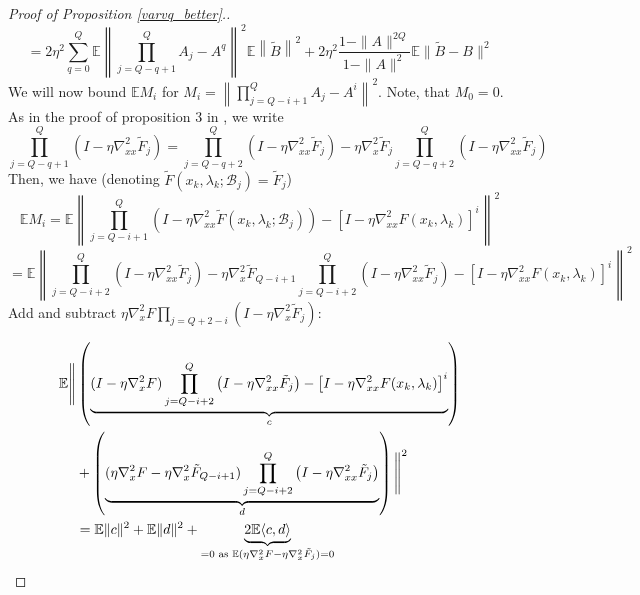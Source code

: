 \documentclass[11pt, twoside]{report}
\begin{document}
\begin{proof}[Proof of Proposition \ref{varvq_better}.]
\[= 2 \eta^2 \sum_{q=0}^{Q} \mathbb{E} \left\| \prod_{j = Q-q+1}^Q A_j - A^{q} \right \|^2 \mathbb{E} \left\| \tilde{B} \right\|^2 + 2\eta^2 \frac{1-\|A\|^{2Q}}{1-\|A\|^2} \mathbb{E} \|\tilde{B} - B\|^2\]
We will now bound $\mathbb{E}M_i$ for $M_i = \left\| \prod_{j = Q-i+1}^Q A_j - A^{i} \right \|^2$. Note, that $M_0 = 0.$ As in the proof of proposition 3 in \cite{stocBio}, we write
    \[\prod_{j=Q-q + 1}^Q\left(I- \eta \nabla_{xx}^2 \tilde{F}_j\right) = \prod_{j=Q-q + 2}^Q \left(I- \eta \nabla_{xx}^2 \tilde{F}_j\right) - \eta \nabla_x^2 \tilde{F}_j\prod_{j=Q-q + 2}^Q\left(I- \eta \nabla_{xx}^2 \tilde{F}_j\right) \]
    Then, we have (denoting $\tilde{F}\left(x_k, \lambda_k ; \mathcal{B}_j\right) = \tilde{F}_j$)
    \[\mathbb{E} M_i = \mathbb{E} \left\| \prod_{j=Q-i+1}^Q\left(I- \eta \nabla_{xx}^2 \tilde{F}\left(x_k, \lambda_k ; \mathcal{B}_j\right)\right) -  \left[I - \eta\nabla_{xx}^2 F \left(x_k, \lambda_k\right)\right]^i \right\|^2\]
    \[ = \mathbb{E} \left\| \prod_{j=Q-i + 2}^Q \left(I- \eta \nabla_{xx}^2 \tilde{F}_j\right) - \eta \nabla_x^2 \tilde{F}_{Q-i+1}\prod_{j=Q-i + 2}^Q\left(I- \eta \nabla_{xx}^2 \tilde{F}_j\right) - \left[I - \eta\nabla_{xx}^2 F \left(x_k, \lambda_k\right)\right]^i \right\|^2\]
    Add and subtract $\eta \nabla_x^2 F \prod_{j = Q + 2 - i}(I - \eta \nabla_x^2 \tilde{F}_j)$:

    \begin{align}
    \mathbb{E} \Bigg\| 
    &\left( \underbrace{(I - \eta \nabla_x^2 F) 
    \prod_{j=Q - i + 2}^Q \left(I - \eta \nabla_{xx}^2 \tilde{F}_j\right) 
    - \left[I - \eta \nabla_{xx}^2 F(x_k, \lambda_k)\right]^i}_{c} \right) \notag \\
    &+ \left( \underbrace{
    (\eta \nabla_x^2 F - \eta \nabla_x^2 \tilde{F}_{Q - i + 1}) 
    \prod_{j=Q - i + 2}^Q \left(I - \eta \nabla_{xx}^2 \tilde{F}_j\right)
    }_{d} \right)
    \Bigg\|^2 \\
    &=\mathbb{E}\|c\|^2 + \mathbb{E}\|d\|^2 + \underbrace{2\mathbb{E}\langle c,d \rangle}_{=0 \text{ as } \mathbb{E}(\eta \nabla_x^2 F - \eta \nabla_x^2 \tilde{F}_j) = 0}
    \end{align}

\end{proof}
\end{document}
